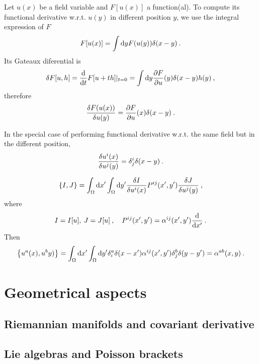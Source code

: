 \begin{example}
    Let $u(x)$ be a field variable and $F[u(x)]$ a function(al). 
    To compute its functional derivative w.r.t. $u(y)$ in different position $y$, we use the integral expression of $F$
    \begin{align}
        F[u(x)] = \int \mathrm{d} y F(u(y)) \delta (x-y) \:.
    \end{align}
    Its Gateaux diferential is
    \begin{align}
        \delta F[u,h] = \frac{\mathrm{d}}{\mathrm{d}t} F[u+th]|_{t=0} = \int \mathrm{d} y \frac{\partial F}{\partial u}(y) \delta(x-y) h(y) \:,
    \end{align}
    therefore
    \begin{align}
        \frac{\delta F(u(x))}{\delta u(y)} = \frac{\partial F}{\partial u}(x) \delta(x-y) \:.
    \end{align}
\end{example}

\begin{example}
    In the special case of performing functional derivative w.r.t. the same field but in the different position,
    \begin{align}
        \frac{\delta u^i(x)}{\delta u^j(y)} = \delta^i_j \delta(x-y) \:.   
    \end{align}
\end{example}

\begin{example}
    \begin{align}
        \left \lbrace I,J \right \rbrace = \int_\Omega \mathrm{d} x' \int_\Omega \mathrm{d} y' \frac{\delta I}{\delta u^i(x)} P^{ij}(x',y') \frac{\delta J}{\delta u^j(y)} \:,
    \end{align}
    where
    \begin{align}
        I = I[u], \: J = J[u] \:, \quad P^{ij}(x',y') = \alpha^{ij}(x',y') \frac{\mathrm{d}}{\mathrm{d}x'} \:.
    \end{align}
    Then
    \begin{align}
        \left \lbrace u^a(x),u^b y) \right \rbrace = \int_\Omega \mathrm{d} x' \int_\Omega \mathrm{d} y' \delta^a_i \delta(x-x') \alpha^{ij}(x',y') \delta^b_j \delta(y-y') = \alpha^{ab}(x,y) \:.
    \end{align}
\end{example}


\section{Geometrical aspects}
\subsection{Riemannian manifolds and covariant derivative}
\subsection{Lie algebras and Poisson brackets}

